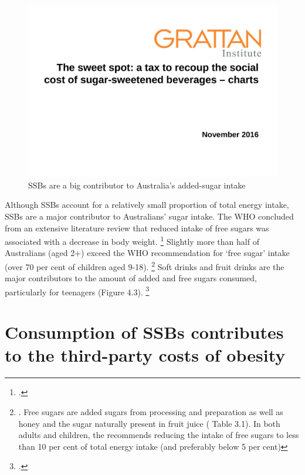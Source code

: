 \documentclass[embargoed]{grattan}
\begin{document}
\begin{figure}
\caption{SSBs are a big contributor to Australia's added-sugar intake}

\includegraphics[page=10]{atlas/ObesityCharts}

\end{figure}

Although SSBs account for a relatively small proportion of total energy intake, SSBs are a major contributor to Australians' sugar intake.
The WHO concluded from an extensive literature review that reduced intake of free sugars was associated with a decrease in body weight.%
\footcite{Organisation2015Sugarsintakeadults} Slightly more than half of Australians (aged 2+) exceed the WHO recommendation for `free sugar' intake (over 70 per cent of children aged 9-18).%
\footnote{\textcite{Lei2016Dietaryintakefood}.
Free sugars are added sugars from processing and preparation as well as honey and the sugar naturally present in fruit juice (\textcite{ABS20164364055011AustralianHealth} Table 3.1).
In both adults and children, the \textcite{Organisation2015Sugarsintakeadults} recommends reducing the intake of free sugars to less than 10 per cent of total energy intake (and preferably below 5 per cent)} Soft drinks and fruit drinks are the major contributors to the amount of added and free sugars consumed, particularly for teenagers (Figure 4.3).%
\footcite{ABS20164364055011AustralianHealth}

\section{Consumption of SSBs contributes to the third-party costs of obesity}\label{consumption-of-ssbs-contributes-to-the-third-party-costs-of-obesity}
\end{document}
